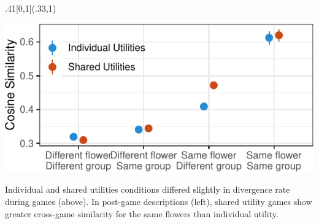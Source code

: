 \documentclass[10pt, xcolor=table, dvipsnames]{beamer}
\begin{document}
	\begin{textblock}{.41}[0,1](.33,1)
	\begin{tcolorbox}[title={ \centering 					Incentive conditions differed a bit}]  
		\begin{minipage}{.45\textwidth}
			\includegraphics[width=\textwidth]{withinend-1.pdf}    
		\end{minipage}
	\hfill
	\noindent
	\begin{minipage}{.45\textwidth}
				\begin{small}
					
				Individual and shared utilities conditions differed slightly in divergence rate during games (above). In post-game descriptions (left), shared utility games show greater cross-game similarity for the same flowers than individual utility.
				
				\end{small}
	\end{minipage}

		
		                        			                                                  
	\end{tcolorbox}
\end{textblock}
\end{document}
